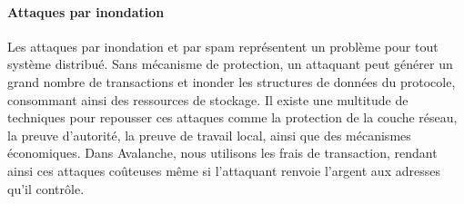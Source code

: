 \documentclass[a4,twocolumn,10pt]{article}
\theoremstyle{definition}
\begin{document}

\paragraph{Attaques par inondation}
Les attaques par inondation et par spam représentent un problème pour tout système distribué.
Sans mécanisme de protection, un attaquant peut générer un grand nombre de transactions et inonder les structures de données du protocole, consommant ainsi des ressources de stockage.
Il existe une multitude de techniques pour repousser ces attaques comme la protection de la couche réseau, la preuve d'autorité, la preuve de travail local, ainsi que des mécanismes économiques.
Dans Avalanche, nous utilisons les frais de transaction, rendant ainsi ces attaques coûteuses même si l'attaquant renvoie l'argent aux adresses qu'il contrôle.



\end{document}
